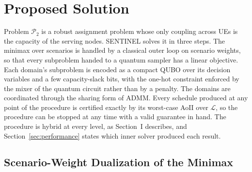 \section{Proposed Solution}
\label{sec:solution}

Problem $\mathscr{P}_{2}$ is a robust assignment problem whose only coupling across UEs is the capacity of the
serving nodes. SENTINEL solves it in three steps. The minimax over scenarios is handled by a classical outer loop on
scenario weights, so that every subproblem handed to a quantum sampler has a linear objective. Each domain's
subproblem is encoded as a compact QUBO over its decision variables and a few capacity-slack bits, with the one-hot
constraint enforced by the mixer of the quantum circuit rather than by a penalty. The domains are coordinated through
the sharing form of ADMM. Every schedule produced at any point of the procedure is certified exactly by its worst-case
AoII over $\mathscr{L}$, so the procedure can be stopped at any time with a valid guarantee in hand. The procedure is
hybrid at every level, as Section~I describes, and Section~\ref{sec:performance} states which inner solver produced
each result.

\subsection{Scenario-Weight Dualization of the Minimax}
\label{sec:dual}

